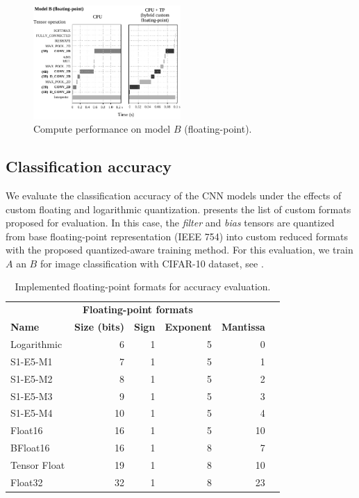 \begin{figure}[t!]
	\centering
	\includegraphics[width=0.5\textwidth]{../figures/sched_B_float.pdf}
	\caption{Compute performance on model $B$ (floating-point).}
	\label{fig:sched_model_b_float}
\end{figure}

\subsection{Classification accuracy}

We evaluate the classification accuracy of the CNN models under the effects of custom floating and logarithmic quantization.  presents the list of custom formats proposed for evaluation. In this case, the \emph{filter} and \emph{bias} tensors are quantized from base floating-point representation (IEEE 754) into custom reduced formats with the proposed quantized-aware training method. For this evaluation, we train $A$ an $B$ for image classification with CIFAR-10 dataset, see .

\begin{table}[!htp]\centering
	\caption{Implemented floating-point formats for accuracy evaluation.}\label{tab:formats}
	\scriptsize
	\begin{tabular}{lrrrrr}\toprule
		\multicolumn{5}{c}{\textbf{Floating-point formats}} \\\cmidrule{1-5}
		\textbf{Name} &\textbf{Size (bits)} &\textbf{Sign} &\textbf{Exponent} &\textbf{Mantissa} \\\midrule
		Logarithmic &6 &1 &5 &0 \\
		S1-E5-M1 &7 &1 &5 &1 \\
		S1-E5-M2 &8 &1 &5 &2 \\
		S1-E5-M3 &9 &1 &5 &3 \\
		S1-E5-M4 &10 &1 &5 &4 \\
		Float16 &16 &1 &5 &10 \\
		BFloat16 &16 &1 &8 &7 \\
		Tensor Float &19 &1 &8 &10 \\
		Float32 &32 &1 &8 &23 \\
		\bottomrule
	\end{tabular}
\end{table}

